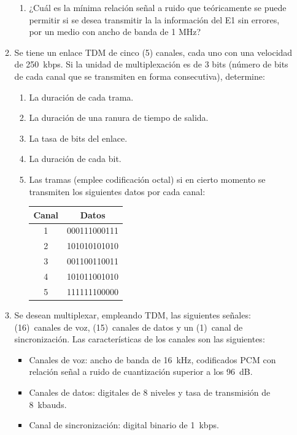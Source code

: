 \begin{enumerate}
\begin{enumerate}
\begin{enumerate}
	
	\item ¿Cuál es la mínima relación señal a ruido que teóricamente se puede permitir si se desea transmitir la la información del E1 sin errores, por un medio con ancho de banda de 1 MHz?
	
	
\end{enumerate}

\item Se tiene un enlace TDM de cinco (5) canales, cada uno con una velocidad de 250~kbps. 
Si la unidad de multiplexación es de 3 bits (número de bits de cada canal que se transmiten en forma consecutiva), determine:
\begin{enumerate}
	\item La duración de cada trama.
	\item La duración de una ranura de tiempo de salida.
	\item La tasa de bits del enlace.
	\item La duración de cada bit.
	\item Las tramas (emplee codificación octal) si en cierto momento se transmiten los siguientes datos por cada canal: 
	
	\begin{tabular}{|c|c|}
		\hline
		Canal & Datos \\
		\hline
		1 & 000111000111 \\ \hline
		2 & 101010101010 \\ \hline
		3 & 001100110011 \\ \hline
		4 & 101011001010 \\ \hline
		5 & 111111100000 \\ \hline
	\end{tabular} 
	
\end{enumerate}
\item Se desean multiplexar, empleando TDM, las siguientes señales: (16)~canales de voz, (15)~canales de datos y un (1)~canal de sincronización.
Las características de los canales son las siguientes:
\begin{itemize}
	\item Canales de voz: ancho de banda de 16~kHz, codificados PCM con relación señal a ruido de cuantización superior a los 96~dB.
	\item Canales de datos: digitales de 8 niveles y tasa de transmisión de 8~kbauds.
	\item Canal de sincronización: digital binario de 1~kbps.
\end{itemize}


\end{enumerate}
\end{enumerate}
